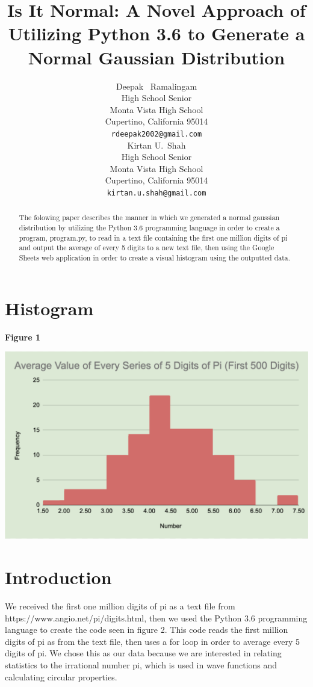 \documentclass{article}
\title{Is It Normal: A Novel Approach of Utilizing Python 3.6 to Generate a Normal Gaussian Distribution}
\author{
  Deepak ~Ramalingam \\
  High School Senior \\
  Monta Vista High School\\
  Cupertino, California 95014 \\
  \texttt{rdeepak2002@gmail.com} \\
   \And
 Kirtan U.~Shah \\
  High School Senior\\
  Monta Vista High School\\
  Cupertino, California 95014 \\
  \texttt{kirtan.u.shah@gmail.com} \\
}
\begin{document}
\maketitle

\begin{abstract}
The folowing paper describes the manner in which we generated a normal gaussian distribution by utilizing the Python 3.6 programming language in order to create a program, program.py, to read in a text file containing the first one million digits of pi and output the average of every 5 digits to a new text file, then using the Google Sheets web application in order to create a visual histogram using the outputted data.
\end{abstract}

\section{Histogram}

\centerline{\textbf{Figure 1}}

{\includegraphics[width=\textwidth]{histogram.png}}

\section{Introduction}
We received the first one million digits of pi as a text file from https://www.angio.net/pi/digits.html, then we used the Python 3.6 programming language to create the code seen in figure 2. This code reads the first million digits of pi as from the text file, then uses a for loop in order to average every 5 digits of pi. We chose this as our data because we are interested in relating statistics to the irrational number pi, which is used in wave functions and calculating circular properties. 
\end{document}
